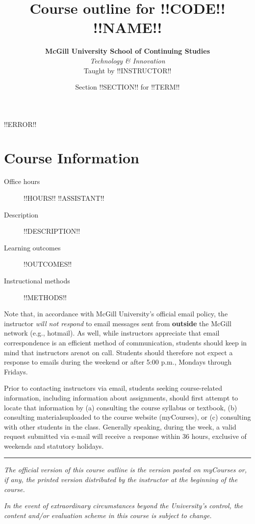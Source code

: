 \documentclass{article}
\title{Course outline for !!CODE!! \\ {\sc !!NAME!!}}
\date{Section !!SECTION!! for !!TERM!!}
\author{{\bf McGill University School of Continuing Studies} \\
  {\em Technology \& Innovation} \\
  Taught by !!INSTRUCTOR!! }
\begin{document}
\maketitle

\thispagestyle{fancy}

!!ERROR!!

\tableofcontents
{}

\newpage

\section{Course Information}

\begin{description}
\item[Office hours]{ !!HOURS!! !!ASSISTANT!! }
\item[Description]{ !!DESCRIPTION!! }
\item[Learning outcomes]{ !!OUTCOMES!! }
\item[Instructional methods]{ !!METHODS!! }
\end{description}

Note that, in accordance with McGill University’s official email
policy, the instructor {\em will not respond} to email messages sent
from {\bf outside} the McGill network (e.g., hotmail). As well, while
instructors appreciate that email correspondence is an efficient
method of communication, students should keep in mind that instructors
arenot on call. Students should therefore not expect a response to
emails during the weekend or after 5:00 p.m., Mondays through
Fridays.

Prior to contacting instructors via email, students seeking
course-related information, including information about assignments,
should first attempt to locate that information by (a) consulting the
course syllabus or textbook, (b) consulting materialsuploaded to the
course website (myCourses), or (c) consulting with other students in
the class. Generally speaking, during the week, a valid request
submitted via e-mail will receive a response within 36 hours,
exclusive of weekends and statutory holidays.

\vfill

\hrule
 
{\em The official version of this course outline is the version posted
  on myCourses or, if any, the printed version distributed by the
  instructor at the beginning of the course.}

{\em In the event of extraordinary circumstances beyond the
  University's control, the content and/or evaluation scheme in this
  course is subject to change.}
\end{document}
